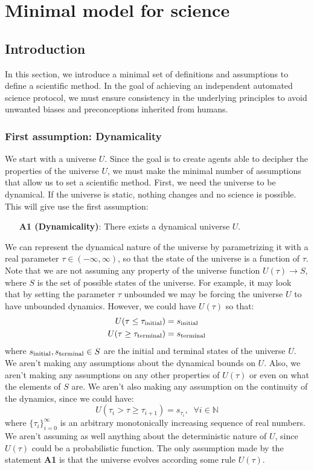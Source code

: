 \documentclass[11pt,a4paper,twoside]{report}
\newcommand{\+}{\textnormal{+} }
\theoremstyle{definition}
\numberwithin{equation}{chapter}
\begin{document}
\vspace{12mm}


\chapter{Minimal model for science} \label{science}

\section{Introduction} \label{sec:intro_science}
In this section, we introduce a minimal set of definitions and assumptions 
to define a scientific method. In the goal of achieving an independent automated
science protocol, we must ensure consistency in the underlying principles to
avoid unwanted biases and preconceptions inherited from humans.
\subsection{First assumption: Dynamicality}
We start with a universe $U$. Since the goal is to create agents
able to decipher the properties of the universe $U$, we must make the minimal
number of assumptions that allow us to set a scientific method. First, we need
the universe to be dynamical. If the universe is static, nothing changes and 
no science is possible. 
This will give use the first assumption:

\begin{itemize}
  \item[\textbf{A1 (Dynamicality)}:] There exists a dynamical universe $U$.
\end{itemize}

We can represent the dynamical nature of the universe by
parametrizing it with a real parameter $\tau \in (-\infty,\infty)$,
so that the state of the universe is a function of $\tau$. Note that we are not 
assuming any property of the universe function $U(\tau)\rightarrow S$, where $S$
is the set of possible states of the universe. For example, it may look that by
setting the parameter $\tau$ unbounded we may be forcing the universe $U$ to 
have unbounded dynamics. However, we could have $U(\tau)$ so that:
\begin{align*}
  U(\tau \leq \tau_{\textnormal{initial}})&=s_\text{initial} \\
  U(\tau \geq \tau_{\textnormal{terminal}})&=s_\text{terminal}
\end{align*}
where $s_\textnormal{initial}, s_\textnormal{terminal} \in S $ are the initial 
and terminal states of the universe $U$. We aren't making any assumptions about
the dynamical bounds on $U$. Also, we aren't making any assumptions on any other
properties of $U(\tau)$ or even on what the elements of $S$ are. We aren't also
making any assumption on the continuity of the dynamics, since we could have:
$$U(\tau_{i} >\tau \geq \tau_{i+1})=s_{\tau_i},\;\;\forall i \in \mathbb{N}$$
where $\{\tau_i\}_{i=0}^\infty$ is an arbitrary monotonically increasing
sequence of real numbers. We aren't assuming as well anything about the 
deterministic nature of $U$, since $U(\tau)$ could be a probabilistic function.
The only assumption made by the statement \textbf{A1} is that the universe 
evolves according some rule $U(\tau)$.
\end{document}
